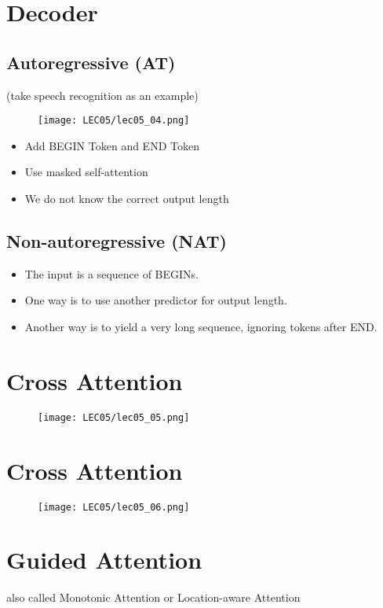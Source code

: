 \documentclass[11pt]{book}
\begin{document}
\section{Decoder}
\subsection*{Autoregressive (AT)}
\noindent (take speech recognition as an example)

\begin{figure}[H]
    \centering
    \texttt{[image: LEC05/lec05\_04.png]}
\end{figure}

\begin{itemize}
    \item Add BEGIN Token and END Token
    \item Use masked self-attention
    \item We do not know the correct output length
\end{itemize}

\subsection*{Non-autoregressive (NAT)}
\begin{itemize}
    \item The input is a sequence of BEGINs.
    \item One way is to use another predictor for output length.
    \item Another way is to yield a very long sequence, ignoring tokens after END.
\end{itemize}

\section{Cross Attention}
\begin{figure}[htbp]
    \centering
    \texttt{[image: LEC05/lec05\_05.png]}
\end{figure}

\section{Cross Attention}
\begin{figure}[htbp]
    \centering
    \texttt{[image: LEC05/lec05\_06.png]}
\end{figure}

\section{Guided Attention}
\noindent also called Monotonic Attention or Location-aware Attention
\end{document}
